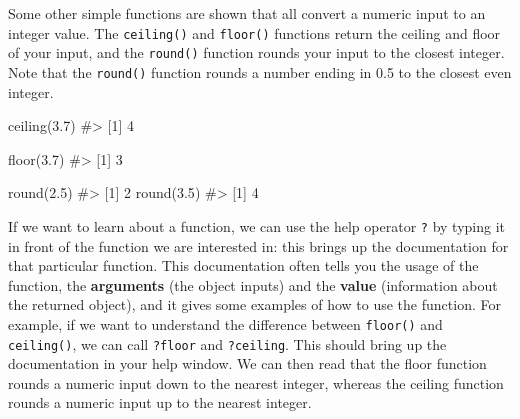 \documentclass[
  letterpaper,
]{latex/krantz}
\makeatletter
\newenvironment{Shaded}{\begin{snugshade}}{\end{snugshade}}
\newcommand{\CommentTok}[1]{\textcolor[rgb]{0.37,0.37,0.37}{#1}}
\newcommand{\FloatTok}[1]{\textcolor[rgb]{0.68,0.00,0.00}{#1}}
\newcommand{\FunctionTok}[1]{\textcolor[rgb]{0.28,0.35,0.67}{#1}}
\newcommand{\NormalTok}[1]{\textcolor[rgb]{0.00,0.23,0.31}{#1}}
\newenvironment{kframe}{%
\medskip{}
\setlength{\fboxsep}{.8em}
 \def\at@end@of@kframe{}%
 \ifinner\ifhmode%
  \def\at@end@of@kframe{\end{minipage}}%
  \begin{minipage}{\columnwidth}%
 \fi\fi%
 \def\FrameCommand##1{\hskip\@totalleftmargin \hskip-\fboxsep
 \colorbox{shadecolor}{##1}\hskip-\fboxsep
     \hskip-\linewidth \hskip-\@totalleftmargin \hskip\columnwidth}%
 \MakeFramed {\advance\hsize-\width
   \@totalleftmargin\z@ \linewidth\hsize
   \@setminipage}}%
 {\par\unskip\endMakeFramed%
 \at@end@of@kframe}
\renewenvironment{Shaded}{\begin{kframe}}{\end{kframe}}
\makeatother
\begin{document}
Some other simple functions are shown that all convert a numeric input
to an integer value. The
\texttt{ceiling()} and
\texttt{floor()} functions
return the ceiling and floor of your input, and the
\texttt{round()} function
rounds your input to the closest integer. Note that the \texttt{round()}
function rounds a number ending in 0.5 to the closest even integer.

\begin{Shaded}
\begin{Highlighting}[]
\FunctionTok{ceiling}\NormalTok{(}\FloatTok{3.7}\NormalTok{)}
\CommentTok{\#\textgreater{} [1] 4}
\end{Highlighting}
\end{Shaded}

\begin{Shaded}
\begin{Highlighting}[]
\FunctionTok{floor}\NormalTok{(}\FloatTok{3.7}\NormalTok{)}
\CommentTok{\#\textgreater{} [1] 3}
\end{Highlighting}
\end{Shaded}

\begin{Shaded}
\begin{Highlighting}[]
\FunctionTok{round}\NormalTok{(}\FloatTok{2.5}\NormalTok{)}
\CommentTok{\#\textgreater{} [1] 2}
\FunctionTok{round}\NormalTok{(}\FloatTok{3.5}\NormalTok{)}
\CommentTok{\#\textgreater{} [1] 4}
\end{Highlighting}
\end{Shaded}

If we want to learn about a function, we can use the help operator
\texttt{?}  by typing it in front of the function
we are interested in: this brings up the documentation
 for that particular function. This
documentation often tells you the usage of the function, the
\textbf{arguments}  (the object inputs) and
the \textbf{value}  (information about the
returned object), and it gives some examples of how to use the function.
For example, if we want to understand the difference between
\texttt{floor()} and \texttt{ceiling()}, we can call \texttt{?floor} and
\texttt{?ceiling}. This should bring up the documentation in your help
window. We can then read that the floor function rounds a numeric input
down to the nearest integer, whereas the ceiling function rounds a
numeric input up to the nearest integer.
\end{document}
